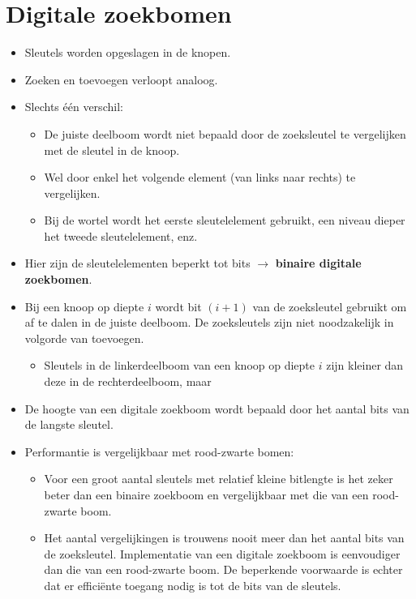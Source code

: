 \section{Digitale zoekbomen}
\begin{itemize}
    \item Sleutels worden opgeslagen in de knopen.
    \item Zoeken en toevoegen verloopt analoog.
    \item Slechts één verschil:
    \begin{itemize}
        \item De juiste deelboom wordt niet bepaald door de zoeksleutel te vergelijken met de sleutel in de knoop.
        \item Wel door enkel het volgende element (van links naar rechts) te vergelijken.
        \item Bij de wortel wordt het eerste sleutelelement gebruikt, een niveau dieper het tweede sleutelelement, enz.
    \end{itemize}
    \item Hier zijn de sleutelelementen beperkt tot bits $\rightarrow$ \textbf{binaire digitale zoekbomen}.
    \item Bij een knoop op diepte $i$ wordt bit $(i + 1)$ van de zoeksleutel gebruikt om af te dalen in de juiste deelboom.
    \alert De zoeksleutels zijn niet noodzakelijk in volgorde van toevoegen.
    \begin{itemize}
        \item Sleutels in de linkerdeelboom van een knoop op diepte $i$ zijn kleiner dan deze in de rechterdeelboom, maar 
    \end{itemize}
    \item De hoogte van een digitale zoekboom wordt bepaald door het aantal bits van de langste sleutel.
    \item Performantie is vergelijkbaar met rood-zwarte bomen:
    \begin{itemize}
        \item Voor een groot aantal sleutels met relatief kleine bitlengte is het zeker beter dan een binaire zoekboom en vergelijkbaar met die van een rood-zwarte boom.
        \item Het aantal vergelijkingen is trouwens nooit meer dan het aantal bits van de zoeksleutel.
        \good Implementatie van een digitale zoekboom is eenvoudiger dan die van een rood-zwarte boom.
        \alert De beperkende voorwaarde is echter dat er efficiënte toegang nodig is tot de bits van de sleutels.
    \end{itemize}
\end{itemize}

